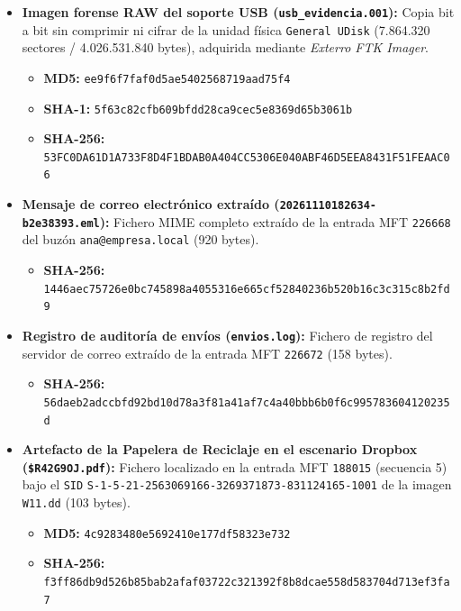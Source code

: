 \begin{itemize}[leftmargin=1.5em, itemsep=0.55em]
	\item \textbf{Imagen forense RAW del soporte USB (\texttt{usb\_evidencia.001}):} Copia bit a bit sin comprimir ni cifrar de la unidad física \texttt{General UDisk} (7.864.320 sectores / 4.026.531.840 bytes), adquirida mediante \textit{Exterro FTK Imager}.
	\begin{itemize}[leftmargin=1.2em]
		\item \textbf{MD5:} \texttt{ee9f6f7faf0d5ae5402568719aad75f4}
		\item \textbf{SHA-1:} \texttt{5f63c82cfb609bfdd28ca9cec5e8369d65b3061b}
		\item \textbf{SHA-256:} \texttt{53FC0DA61D1A733F8D4F1BDAB0A404CC5306E040ABF46D5EEA8431F51FEAAC06}
	\end{itemize}
	
	\item \textbf{Mensaje de correo electrónico extraído (\texttt{20261110182634-b2e38393.eml}):} Fichero MIME completo extraído de la entrada MFT \texttt{226668} del buzón \texttt{ana@empresa.local} (920 bytes).
	\begin{itemize}[leftmargin=1.2em]
		\item \textbf{SHA-256:} \texttt{1446aec75726e0bc745898a4055316e665cf52840236b520b16c3c315c8b2fd9}
	\end{itemize}
	
	\item \textbf{Registro de auditoría de envíos (\texttt{envios.log}):} Fichero de registro del servidor de correo extraído de la entrada MFT \texttt{226672} (158 bytes).
	\begin{itemize}[leftmargin=1.2em]
		\item \textbf{SHA-256:} \texttt{56daeb2adccbfd92bd10d78a3f81a41af7c4a40bbb6b0f6c995783604120235d}
	\end{itemize}
	\item \textbf{Artefacto de la Papelera de Reciclaje en el escenario Dropbox (\texttt{\$R42G9OJ.pdf}):} Fichero localizado en la entrada MFT \texttt{188015} (secuencia 5) bajo el \texttt{SID} \nolinkurl{S-1-5-21-2563069166-3269371873-831124165-1001} de la imagen \texttt{W11.dd} (103 bytes).
	\begin{itemize}[leftmargin=1.2em]
		\item \textbf{MD5:} \texttt{4c9283480e5692410e177df58323e732}
		\item \textbf{SHA-256:} \texttt{f3ff86db9d526b85bab2afaf03722c321392f8b8dcae558d583704d713ef3fa7}
	\end{itemize}
	

\end{itemize}
